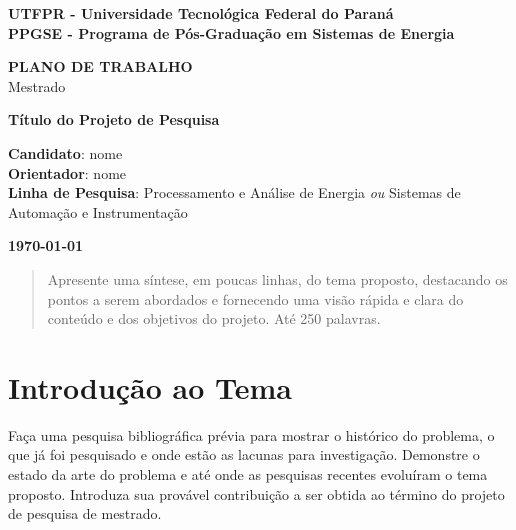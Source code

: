 \documentclass[a4paper,12pt]{article}
\begin{document}

\begin{titlepage}
\thispagestyle{empty}
\begin{center}
\large{\bf{UTFPR - Universidade Tecnológica Federal do Paraná}} \\
\large{\bf{PPGSE - Programa de Pós-Graduação em Sistemas de Energia}} \\
\end{center}
\vfill

\centering
\textbf{{\LARGE PLANO DE TRABALHO}}  \\ \vspace{0.5cm}
{\LARGE Mestrado}
\vfill




\textbf{{\Large Título do Projeto de Pesquisa}} \\ %
\vfill
\begin{flushleft}
\textbf{Candidato}: nome \hfill{}\\
\textbf{Orientador}: nome \hfill{}\\
\textbf{Linha de Pesquisa}: Processamento e Análise de Energia {\it ou} Sistemas de Automação e Instrumentação \hfill{}\\
\end{flushleft}

\vfill


\begin{center}
\large{\bf{\today}}
\end{center}
\end{titlepage}



\begin{abstract}
Apresente uma síntese, em poucas linhas, do tema proposto, destacando os pontos a serem abordados e fornecendo uma visão rápida e clara do conteúdo e dos objetivos do projeto. Até 250 palavras.
\end{abstract}


\section{Introdução ao Tema}
Faça uma pesquisa bibliográfica prévia para mostrar o histórico do problema, o que já foi pesquisado e onde estão as lacunas para investigação. Demonstre o estado da arte do problema e até onde as pesquisas recentes evoluíram o tema proposto. Introduza sua provável contribuição a ser obtida ao término do projeto de pesquisa de mestrado.
\end{document}

